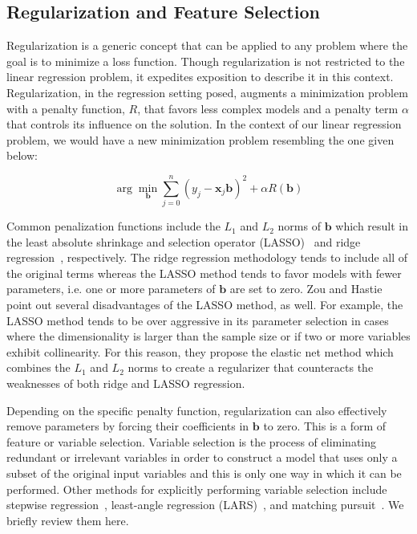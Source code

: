 \subsection{Regularization and Feature Selection}
\label{sec:regularization}
Regularization is a generic concept that can be applied to any problem where the goal is to minimize a loss function.
%
Though regularization is not restricted to the linear regression problem, it expedites exposition to describe it in this context.
%
Regularization, in the regression setting posed, augments a minimization problem with a penalty function, $R$, that favors less complex models and a penalty term $\alpha$ that controls its influence on the solution.
%
In the context of our linear regression problem, we would have a new minimization problem resembling the one given below:

\begin{equation}
\arg\min_{\mathbf{b}} \sum_{j=0}^n(y_j - \mathbf{x}_j\mathbf{b})^2 + \alpha R(\mathbf{b})
\label{eq:genericRegularization}
\end{equation}

Common penalization functions include the $L_1$ and $L_2$ norms of $\mathbf{b}$ which result in the least absolute shrinkage and selection operator (LASSO)~\cite{Tibshirani1996} and ridge regression~\cite{Hoerl1959,Hoerl1962}, respectively.
%
The ridge regression methodology tends to include all of the original terms whereas the LASSO method tends to favor models with fewer parameters, i.e. one or more parameters of $\mathbf{b}$ are set to zero.
%
Zou and Hastie~\cite{ZouHastie2005} point out several disadvantages of the LASSO method, as well.
%
For example, the LASSO method tends to be over aggressive in its parameter selection in cases where the dimensionality is larger than the sample size or if two or more variables exhibit collinearity.
%
For this reason, they propose the elastic net method which combines the $L_1$ and $L_2$ norms to create a regularizer that counteracts the weaknesses of both ridge and LASSO regression.

Depending on the specific penalty function, regularization can also effectively remove parameters by forcing their coefficients in $\mathbf{b}$ to zero.
%
This is a form of feature or variable selection.
%
Variable selection is the process of eliminating redundant or irrelevant variables in order to construct a model that uses only a subset of the original input variables and this is only one way in which it can be performed.
%
Other methods for explicitly performing variable selection include stepwise regression~\cite{DraperSmith2014}, least-angle regression (LARS)~\cite{EfronHastieJohnstone2004}, and matching pursuit~\cite{MallatZhang1993,DavisMallatZhang1994,PatiRezaiifarKrishnaprasad1993}.
%
We briefly review them here.


